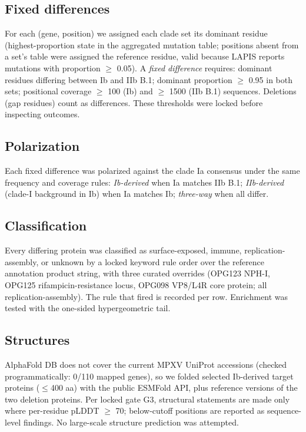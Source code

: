 \documentclass[11pt]{article}
\begin{document}
\subsection{Fixed differences}
For each (gene, position) we assigned each clade set its dominant residue (highest-proportion state
in the aggregated mutation table; positions absent from a set's table were assigned the reference
residue, valid because LAPIS reports mutations with proportion $\geq$ 0.05). A \emph{fixed
difference} requires: dominant residues differing between Ib and IIb B.1; dominant proportion
$\geq$ 0.95 in both sets; positional coverage $\geq$ 100 (Ib) and $\geq$ 1500 (IIb B.1) sequences.
Deletions (gap residues) count as differences. These thresholds were locked before inspecting
outcomes.

\subsection{Polarization}
Each fixed difference was polarized against the clade Ia consensus under the same frequency and
coverage rules: \emph{Ib-derived} when Ia matches IIb B.1; \emph{IIb-derived} (clade-I background in
Ib) when Ia matches Ib; \emph{three-way} when all differ.

\subsection{Classification}
Every differing protein was classified as surface-exposed, immune, replication-assembly, or unknown
by a locked keyword rule order over the reference annotation product string, with three curated
overrides (OPG123 NPH-I, OPG125 rifampicin-resistance locus, OPG098 VP8/L4R core protein; all
replication-assembly). The rule that fired is recorded per row. Enrichment was tested with the
one-sided hypergeometric tail.

\subsection{Structures}
AlphaFold DB does not cover the current MPXV UniProt accessions (checked programmatically:
0/110 mapped genes), so we folded selected Ib-derived target proteins ($\leq$400 aa) with the public
ESMFold API, plus reference versions of the two deletion proteins. Per locked gate G3, structural
statements are made only where per-residue pLDDT $\geq$ 70; below-cutoff positions are reported as
sequence-level findings. No large-scale structure prediction was attempted.
\end{document}
